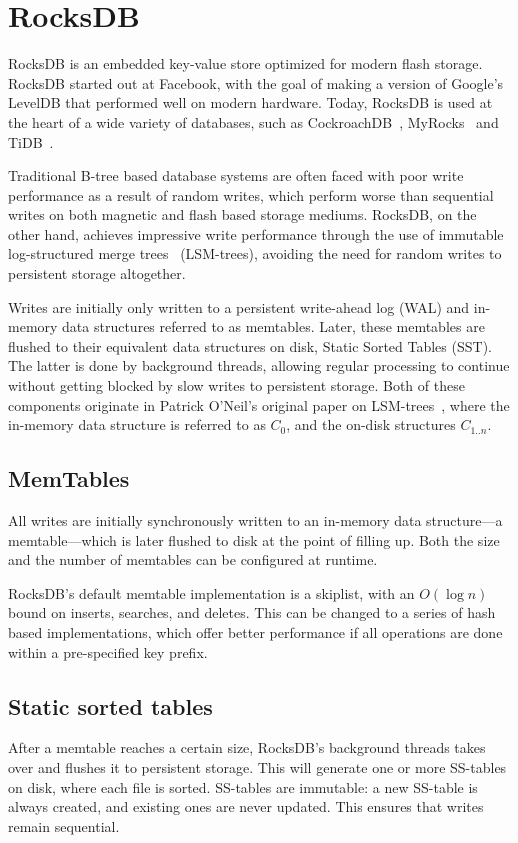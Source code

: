 \section{RocksDB}\label{sec:rocksdb}
RocksDB is an embedded key-value store optimized for modern flash storage.
RocksDB started out at Facebook, with the goal of making a version of Google's
LevelDB that performed well on modern hardware. Today, RocksDB is used at the
heart of a wide variety of databases, such as CockroachDB~\cite{cockroach},
MyRocks~\cite{myrocks} and TiDB~\cite{tidb}.

Traditional B-tree based database systems are often faced with poor write
performance as a result of random writes, which perform worse than sequential
writes on both magnetic and flash based storage mediums. RocksDB, on the other
hand, achieves impressive write performance through the use of immutable
log-structured merge trees~\cite{lsm} (LSM-trees), avoiding the need for random
writes to persistent storage altogether.

Writes are initially only written to a persistent write-ahead log (WAL) and
in-memory data structures referred to as memtables. Later, these memtables are
flushed to their equivalent data structures on disk, Static Sorted Tables (SST).
The latter is done by background threads, allowing regular processing to
continue without getting blocked by slow writes to persistent storage. Both of
these components originate in Patrick O'Neil's original paper on
LSM-trees~\cite{lsm}, where the in-memory data structure is referred to as $ C_0
$, and the on-disk structures $ C_{1..n} $.

\subsection{MemTables}
All writes are initially synchronously written to an in-memory data structure---a
memtable---which is later flushed to disk at the point of filling up. Both the
size and the number of memtables can be configured at runtime.

RocksDB's default memtable implementation is a skiplist, with an $ O(\log n) $
bound on inserts, searches, and deletes. This can be changed to a series of hash
based implementations, which offer better performance if all operations are done
within a pre-specified key prefix.

\subsection{Static sorted tables}
After a memtable reaches a certain size, RocksDB's background threads takes over
and flushes it to persistent storage. This will generate one or more SS-tables
on disk, where each file is sorted. SS-tables are immutable: a new SS-table is
always created, and existing ones are never updated. This ensures that writes
remain sequential.

